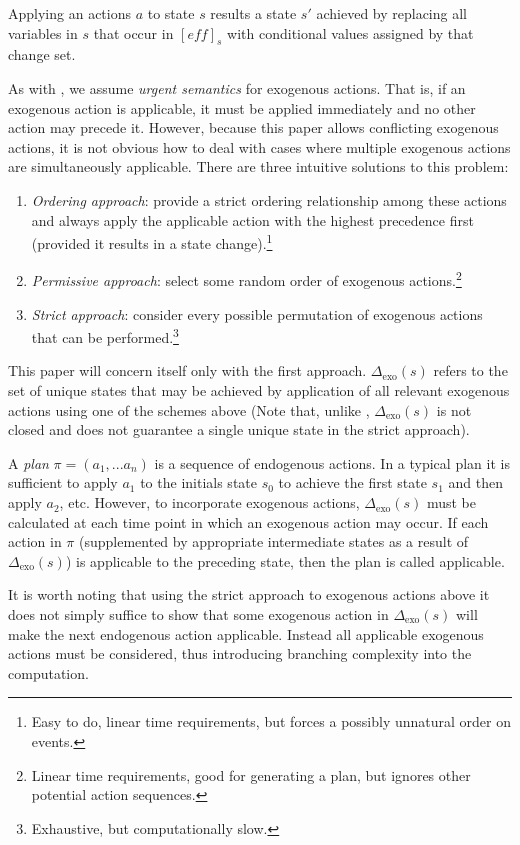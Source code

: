 \documentclass{article}
\theoremstyle{plain}
\theoremstyle{definition}
\begin{document}
Applying an actions $a$ to state $s$ results a state $s'$ achieved by replacing all variables in $s$ that occur in $[eff]_s$ with conditional values assigned by that change set.

As with \cite{lind2019ethical}, we assume \textit{urgent semantics} for exogenous actions. That is, if an exogenous action is applicable, it must be applied immediately and no other action may precede it. However, because this paper allows conflicting exogenous actions, it is not obvious how to deal with cases where multiple exogenous actions are simultaneously applicable. There are three intuitive solutions to this problem:
\begin{enumerate}
\item \textit{Ordering approach}: provide a strict ordering relationship among these actions and always apply the applicable action with the highest precedence first (provided it results in a state change).\footnote{Easy to do, linear time requirements, but forces a possibly unnatural order on events.}
\item \textit{Permissive approach}: select some random order of exogenous actions.\footnote{Linear time requirements, good for generating a plan, but ignores other potential action sequences.}
\item \textit{Strict approach}: consider every possible permutation of exogenous actions that can be performed.\footnote{Exhaustive, but computationally slow.}
\end{enumerate}

This paper will concern itself only with the first approach. $\Delta_{\textrm{exo}}(s)$ refers to the set of unique states that may be achieved by application of all relevant exogenous actions using one of the schemes above (Note that, unlike \cite{lind2019ethical}, $\Delta_{\textrm{exo}}(s)$ is not closed and does not guarantee a single unique state in the strict approach).

A \textit{plan} $\pi=(a_1,...a_n)$ is a sequence of endogenous actions. In a typical plan it is sufficient to apply $a_1$ to the initials state $s_0$ to achieve the first state $s_1$ and then apply $a_2$, etc. However, to incorporate exogenous actions, $\Delta_{\textrm{exo}}(s)$ must be calculated at each time point in which an exogenous action may occur. If each action in $\pi$ (supplemented by appropriate intermediate states as a result of $\Delta_{\textrm{exo}}(s)$) is applicable to the preceding state, then the plan is called applicable. 

It is worth noting that using the strict approach to exogenous actions above it does not simply suffice to show that some exogenous action in $\Delta_{\textrm{exo}}(s)$ will make the next endogenous action applicable. Instead all applicable exogenous actions must be considered, thus introducing branching complexity into the computation.
\end{document}
